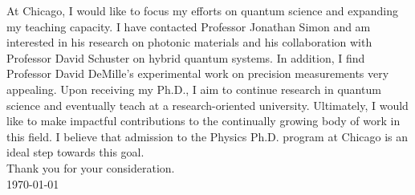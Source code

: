 \documentclass[12pt]{article}
\begin{document}
At Chicago, I would like to focus my efforts on quantum science and expanding my teaching capacity. I have contacted Professor Jonathan Simon and am interested in his research on photonic materials and his collaboration with Professor David Schuster on hybrid quantum systems. In addition, I find Professor David DeMille's experimental work on precision measurements very appealing. Upon receiving my Ph.D., I aim to continue research in quantum science and eventually teach at a research-oriented university. Ultimately, I would like to make impactful contributions to the continually growing body of work in this field. I believe that admission to the Physics Ph.D. program at Chicago is an ideal step towards this goal. \\

\noindent Thank you for your consideration. \\

\noindent \today
	











	
	
	
	
	
\end{document}
